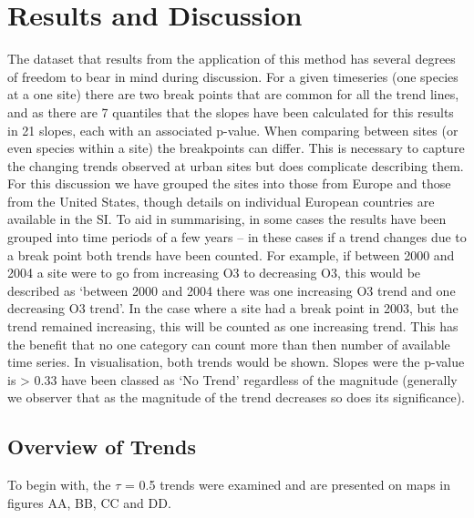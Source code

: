 \documentclass[journal abbreviation, manuscript]{copernicus}
\begin{document}
\section{Results and Discussion}
The dataset that results from the application of this method has several degrees of freedom to bear in mind during discussion. For a given timeseries (one species at a one site) there are two break points that are common for all the trend lines, and as there are 7 quantiles that the slopes have been calculated for this results in 21 slopes, each with an associated p-value. When comparing between sites (or even species within a site) the breakpoints can differ. This is necessary to capture the changing trends observed at urban sites but does complicate describing them. For this discussion we have grouped the sites into those from Europe and those from the United States, though details on individual European countries are available in the SI. 
To aid in summarising, in some cases the results have been grouped into time periods of a few years – in these cases if a trend changes due to a break point both trends have been counted. For example, if between 2000 and 2004 a site were to go from increasing O3 to decreasing O3, this would be described as ‘between 2000 and 2004 there was one increasing O3 trend and one decreasing O3 trend’. In the case where a site had a break point in 2003, but the trend remained increasing, this will be counted as one increasing trend. This has the benefit that no one category can count more than then number of available time series. In visualisation, both trends would be shown.
Slopes were the p-value is > 0.33 have been classed as ‘No Trend’ regardless of the magnitude (generally we observer that as the magnitude of the trend decreases so does its significance).

\subsection{Overview of Trends}
To begin with, the $\tau$ = 0.5 trends were examined and are presented on maps in figures AA, BB, CC and DD. 
\end{document}
